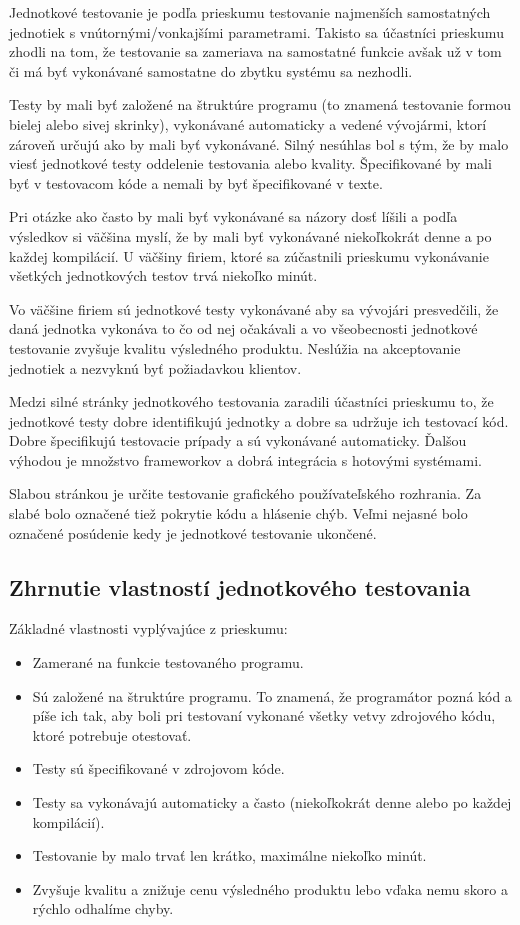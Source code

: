 \documentclass[11pt,twoside,slovak,a4paper]{article}
\begin{document}
	Jednotkové testovanie je podľa prieskumu testovanie najmenších samostatných jednotiek s vnútornými/vonkajšími parametrami. Takisto sa účastníci prieskumu zhodli na tom, že testovanie sa zameriava na samostatné funkcie avšak už v tom či má byť vykonávané samostatne do zbytku systému sa nezhodli.
	
	Testy by mali byť založené na štruktúre programu (to znamená testovanie formou bielej alebo sivej skrinky), vykonávané automaticky a vedené vývojármi, ktorí zároveň určujú ako by mali byť vykonávané. Silný nesúhlas bol s tým, že by malo viesť jednotkové testy oddelenie testovania alebo kvality. Špecifikované by mali byť v testovacom kóde a nemali by byť špecifikované v texte.
	
	Pri otázke ako často by mali byť vykonávané sa názory dosť líšili a podľa výsledkov si väčšina myslí, že by mali byť vykonávané niekoľkokrát denne a po každej kompilácií. U väčšiny firiem, ktoré sa zúčastnili prieskumu vykonávanie všetkých jednotkových testov trvá niekoľko minút.
	
	Vo väčšine firiem sú jednotkové testy vykonávané aby sa vývojári presvedčili, že daná jednotka vykonáva to čo od nej očakávali a vo všeobecnosti jednotkové testovanie zvyšuje kvalitu výsledného produktu. Neslúžia na akceptovanie jednotiek a nezvyknú byť požiadavkou klientov.
	
	Medzi silné stránky jednotkového testovania zaradili účastníci prieskumu to, že jednotkové testy dobre identifikujú jednotky a dobre sa udržuje ich testovací kód. Dobre špecifikujú testovacie prípady a sú vykonávané automaticky. Ďalšou výhodou je množstvo frameworkov a dobrá integrácia s hotovými systémami.
	
	Slabou stránkou je určite testovanie grafického používateľského rozhrania. Za slabé bolo označené tiež pokrytie kódu a hlásenie chýb. Veľmi nejasné bolo označené posúdenie kedy je jednotkové testovanie ukončené.
	
	\subsection{Zhrnutie vlastností jednotkového testovania}	
		Základné vlastnosti vyplývajúce z prieskumu:
		\begin{itemize}
			\item Zamerané na funkcie testovaného programu.
			\item Sú založené na štruktúre programu. To znamená, že programátor pozná kód a píše ich tak, aby boli pri testovaní vykonané všetky vetvy zdrojového kódu, ktoré potrebuje otestovať.
			\item Testy sú špecifikované v zdrojovom kóde.
			\item Testy sa vykonávajú automaticky a často (niekoľkokrát denne alebo po každej kompilácií).
			\item Testovanie by malo trvať len krátko, maximálne niekoľko minút.
			\item Zvyšuje kvalitu a znižuje cenu výsledného produktu lebo vďaka nemu skoro a rýchlo odhalíme chyby.
		\end{itemize}
		
\end{document}

